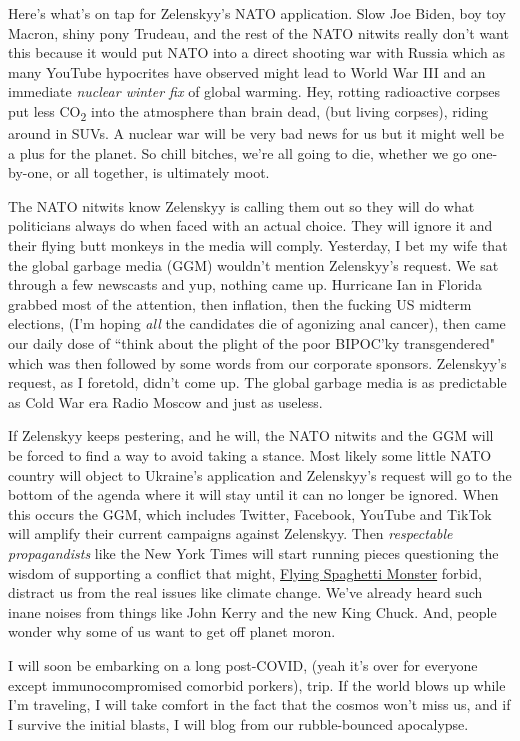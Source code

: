 Here's what's on tap for Zelenskyy's NATO application. Slow Joe Biden,
boy toy Macron, shiny pony Trudeau, and the rest of the NATO nitwits
really don't want this because it would put NATO into a direct shooting
war with Russia which as many YouTube hypocrites have observed might
lead to World War III and an immediate \emph{nuclear winter fix} of
global warming. Hey, rotting radioactive corpses put less
CO\textsubscript{2} into the atmosphere than brain dead, (but living
corpses), riding around in SUVs. A nuclear war will be very bad news for
us but it might well be a plus for the planet. So chill bitches, we're
all going to die, whether we go one-by-one, or all together, is
ultimately moot.

The NATO nitwits know Zelenskyy is calling them out so they will do what
politicians always do when faced with an actual choice. They will ignore
it and their flying butt monkeys in the media will comply. Yesterday, I
bet my wife that the global garbage media (GGM) wouldn't mention
Zelenskyy's request. We sat through a few newscasts and yup, nothing
came up. Hurricane Ian in Florida grabbed most of the attention, then
inflation, then the fucking US midterm elections, (I'm hoping \emph{all}
the candidates die of agonizing anal cancer), then came our daily dose
of ``think about the plight of the poor BIPOC'ky transgendered" which
was then followed by some words from our corporate sponsors. Zelenskyy's
request, as I foretold, didn't come up. The global garbage media is as
predictable as Cold War era Radio Moscow and just as useless.

If Zelenskyy keeps pestering, and he will, the NATO nitwits and the GGM
will be forced to find a way to avoid taking a stance. Most likely some
little NATO country will object to Ukraine's application and Zelenskyy's
request will go to the bottom of the agenda where it will stay until it
can no longer be ignored. When this occurs the GGM, which includes
Twitter, Facebook, YouTube and TikTok will amplify their current
campaigns against Zelenskyy. Then \emph{respectable}
\emph{propagandists} like the New York Times will start running pieces
questioning the wisdom of supporting a conflict that might,
\href{https://www.spaghettimonster.org/}{Flying Spaghetti Monster}
forbid, distract us from the real issues like climate change. We've
already heard such inane noises from things like John Kerry and the new
King Chuck. And, people wonder why some of us want to get off planet
moron.

I will soon be embarking on a long post-COVID, (yeah it's over for
everyone except immunocompromised comorbid porkers), trip. If the world
blows up while I'm traveling, I will take comfort in the fact that the
cosmos won't miss us, and if I survive the initial blasts, I will blog
from our rubble-bounced apocalypse.

